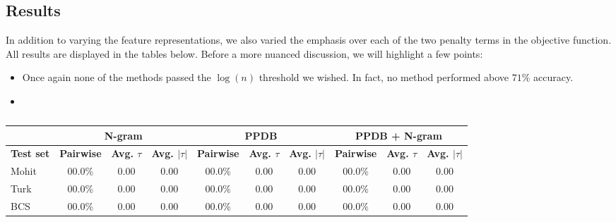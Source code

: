 \subsection{Results}

In addition to varying the feature representations, we also varied the emphasis over each of the two penalty terms in the objective function. All results are displayed in the tables below. Before a more nuanced discussion, we will highlight a few points:

\begin{itemize}
	\item Once again none of the methods passed the $\log(n)$ threshold we wished. In fact, no method performed above $71\%$ accuracy.
	\item 
\end{itemize}


\begin{table}
\small
\centering
\begin{tabular}{|l|ccc|ccc|ccc|}
	\hline 
	& \multicolumn{3}{c|}{N-gram} 
	& \multicolumn{3}{c|}{PPDB} 
	& \multicolumn{3}{c|}{PPDB + N-gram} \\
	\hline 
	\bf Test set
	& \bf Pairwise & \bf Avg. $\tau$ & \bf Avg. $|\tau|$ 
	& \bf Pairwise & \bf Avg. $\tau$ & \bf Avg. $|\tau|$ 
	& \bf Pairwise & \bf Avg. $\tau$ & \bf Avg. $|\tau|$ \\ 
	\hline
	Mohit & 00.0\%  & 0.00 & 0.00  & 00.0\% & 0.00 & 0.00 & 00.0\% & 0.00 & 0.00 \\ 
	Turk  & 00.0\%  & 0.00 & 0.00  & 00.0\% & 0.00 & 0.00 & 00.0\% & 0.00 & 0.00 \\
	BCS   & 00.0\%  & 0.00 & 0.00  & 00.0\% & 0.00 & 0.00 & 00.0\% & 0.00 & 0.00 \\
	\hline
\end{tabular}
\caption{\label{font-table} }
\end{table}




















